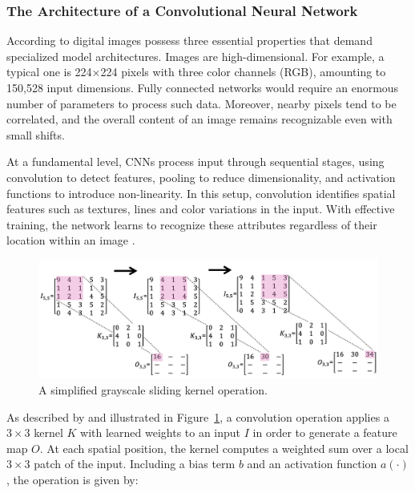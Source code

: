 \documentclass[a4paper,10pt,twocolumn]{article}
\numberwithin{figure}{section}
\numberwithin{table}{section}
\begin{document}
\vspace{0.3cm}
\subsubsection{{The Architecture of a Convolutional Neural Network}}
\vspace{0.3cm}

According to \cite[p. 163]{prince2023understanding} digital images possess 
three essential properties that demand specialized model architectures.
Images are high-dimensional. For example, a typical one
is 224×224 pixels with three color channels (RGB), 
amounting to 150,528 input dimensions. 
Fully connected networks would require an enormous number 
of parameters to process such data. Moreover, 
nearby pixels tend to be correlated, and the overall 
content of an image remains recognizable even with small shifts. 

At a fundamental level, CNNs process input through sequential stages, 
using convolution to detect features, pooling to 
reduce dimensionality, and activation functions to 
introduce non-linearity.
In this setup, convolution identifies spatial features such as
textures, lines and color variations in the input. 
With effective training, the network learns to recognize 
these attributes regardless of their location within an image \citep[Chapter~2]{VerdhanVaibhav2021CVUD}.

\begin{figure}[htbp]
    \centering
    \includegraphics[width=1\linewidth]{kernel.png} 
    \caption{A simplified grayscale sliding kernel operation.}
    \label{fig:kernel}  
\end{figure}

As described by \cite[p. 170]{prince2023understanding} 
and illustrated in Figure~\ref{fig:kernel}, a convolution 
operation applies a \(3 \times 3\) kernel \(K\) with 
learned weights to an input \(I\) in order to generate 
a feature map \(O\). At each spatial position, 
the kernel computes a weighted sum over a local \(3 \times 3\) 
patch of the input. Including a bias term \(b\) and an activation 
function \(a(\cdot)\), the operation is given by:
\end{document}
